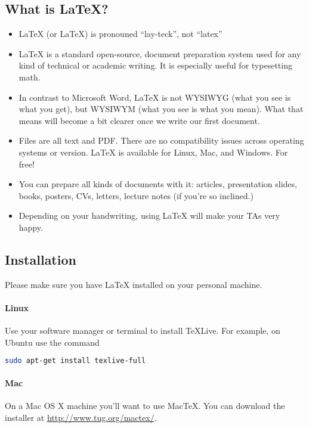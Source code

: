 \subsection{What is \LaTeX{}?}

\begin{itemize}
\item \LaTeX{} (or LaTeX) is pronouned ``lay-teck'', not ``latex''

\item \LaTeX{} is a standard open-source, document preparation system used for any kind of technical or academic writing. It is especially useful for typesetting math.

\item In contrast to Microsoft Word, \LaTeX{} is not WYSIWYG (what you see is what you get), but WYSIWYM (what you see is what you mean). What that means will become a bit clearer once we write our first document.

\item Files are all text and PDF. There are no compatibility issues across operating systems or version. \LaTeX{} is available for Linux, Mac, and Windows. For free!

\item You can prepare all kinds of documents with it: articles, presentation slides, books, posters, CVs, letters, lecture notes (if you're so inclined.)

\item Depending on your handwriting, using \LaTeX{} will make your TAs very happy.

\end{itemize}

\subsection{Installation}

Please make sure you have \LaTeX{} installed on your personal machine.

\paragraph{Linux} Use your software manager or terminal to install \TeX{}Live. For example, on Ubuntu use the command

\begin{lstlisting}[language=bash]
sudo apt-get install texlive-full
\end{lstlisting}

\paragraph{Mac} On a Mac OS X machine you'll want to use Mac\TeX{}. You can download the installer at \url{http://www.tug.org/mactex/}. 

